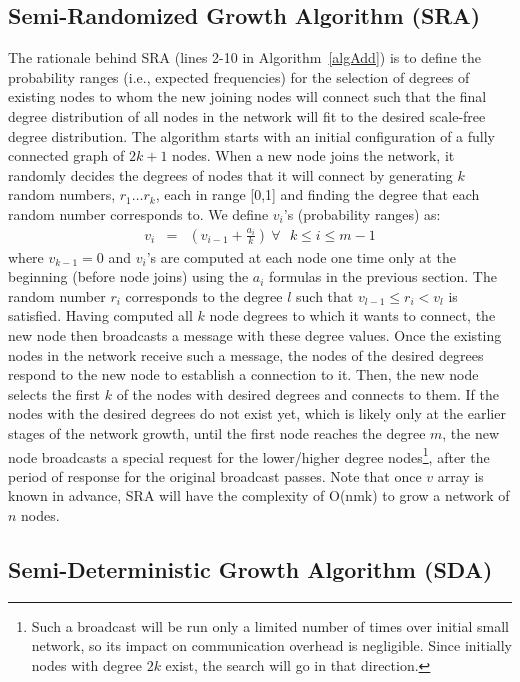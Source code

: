 \documentclass[10pt,journal,cspaper,compsoc]{IEEEtran}
\begin{document}
\subsection{Semi-Randomized Growth Algorithm (SRA)}
The rationale behind SRA (lines 2-10 in Algorithm~\ref{algAdd}) is to define the probability ranges (i.e., expected frequencies) for the selection of degrees of existing nodes to whom the new joining nodes will connect such that the final degree distribution of all nodes in the network will fit to the desired scale-free degree distribution. The algorithm starts with an initial configuration of a fully connected graph of $2k+1$ nodes. When a new node joins the network, it randomly decides the degrees of nodes that it will connect by generating $k$ random numbers, $r_1 \ldots r_k$, each in range [0,1] and finding the degree that each random number corresponds to. We define $v_i$'s (probability ranges) as:
\begin{eqnarray}
\label{eqx}
v_i &=& \left(v_{i-1}+\frac{a_i}{k}\right)~\mbox{$\forall$ $k \leq i \leq m-1$}
\end{eqnarray}
where $v_{k-1}=0$ and $v_i$'s are computed at each node one time only at the beginning (before node joins) using the $a_i$ formulas in the previous section. The random number $r_i$ corresponds to the degree $l$ such that $v_{l-1} \leq r_i < v_l$ is satisfied. Having computed all $k$ node degrees to which it wants to connect, the new node then broadcasts a message with these degree values. Once the existing nodes in the network receive such a message, the nodes of the desired degrees respond to the new node to establish a connection to it. Then, the new node selects the first $k$ of the nodes with desired degrees and connects to them. If the nodes with the desired degrees do not exist yet, which is likely only at the earlier stages of the network growth, until the first node reaches the degree $m$, the new node broadcasts a special request for the lower/higher degree nodes\footnote{Such a broadcast will be run only a limited number of times over initial small network, so its impact on communication overhead is negligible. Since initially nodes with degree $2k$ exist, the search will go in that direction.}, after the period of response for the original broadcast passes. Note that once $v$ array is known in advance, SRA will have the complexity of O(nmk) to grow a network of $n$ nodes. 

\subsection{Semi-Deterministic Growth Algorithm (SDA)}
\end{document}
